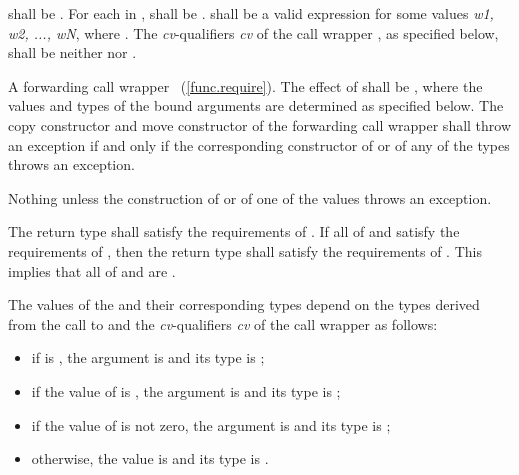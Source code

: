 \begin{itemdescr}
\pnum
\requires
{} shall be . For each 
in ,  shall be .
 shall be  a valid
expression for some
values \textit{w1, w2, ..., wN}, where
.
The \textit{cv}-qualifiers \textit{cv} of the call wrapper ,
as specified below, shall be neither  nor .

\pnum
\returns
A forwarding call wrapper ~(\ref{func.require}).
The effect of
 shall be , where the values and types of the bound
arguments  are determined as specified below.
The copy constructor and move constructor of the forwarding call wrapper shall throw an
exception if and only if the corresponding constructor of  or of any of the types
 throws an exception.

\pnum
\throws Nothing unless the construction of
 or of one of the values  throws an exception.

\pnum
\remarks The return type shall satisfy the requirements of . If all
of  and  satisfy the requirements of , then the
return type shall satisfy the requirements of . \enternote This implies
that all of  and  are . \exitnote
\end{itemdescr}

\pnum
{}%
The values of the   and their
corresponding types  depend on the
types  derived from
the call to  and the
\textit{cv}-qualifiers \textit{cv} of the call wrapper  as follows:

\begin{itemize}
\item if  is , the
argument is  and its type  is ;

\item if the value of 
is , the argument is   and its
type  is
;

\item if the value  of 
is not zero, the  argument is 
and its type 
is ;

\item otherwise, the value is  and its type 
is .
\end{itemize}

